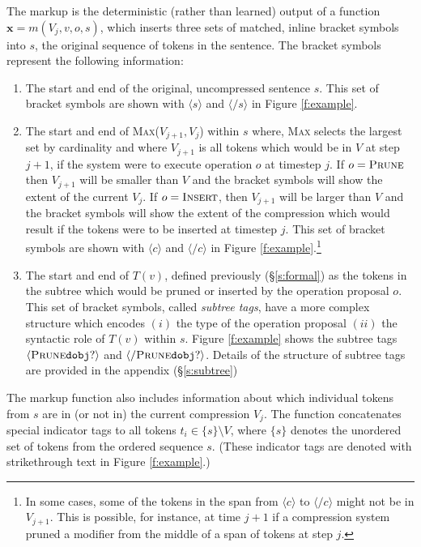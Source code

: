 \documentclass[11pt,a4paper]{article}
\begin{document}
The markup is the deterministic (rather than learned) output of a function $\bm{x}=m(V_j,v,o,s)$, which inserts three sets of matched, inline bracket symbols into $s$, the original sequence of tokens in the sentence. The bracket symbols represent the following information:

\begin{enumerate}
\item{The start and end of the original, uncompressed sentence $s$. This set of bracket symbols are shown with $\langle s \rangle$ and $\langle / s \rangle$ in Figure \ref{f:example}.}
\item{The start and end of \textsc{Max}($V_{j+1}, V_{j}$) within $s$ where, \textsc{Max} selects the largest set by cardinality and where $V_{j+1}$ is all tokens which would be in $V$ at step $j+1$, if the system were to execute operation $o$ at timestep $j$. If $o=\textsc{Prune}$ then $V_{j+1}$ will be smaller than $V$ and the bracket symbols will show the extent of the current $V_j$. If $o=\textsc{Insert}$, then $V_{j+1}$ will be larger than $V$ and the bracket symbols will show the extent of the compression which would result if the tokens were to be inserted at timestep $j$. This set of bracket symbols are shown with $\langle c \rangle$ and $\langle / c \rangle$ in Figure \ref{f:example}.\footnote{In some cases, some of the tokens in the span from $\langle c \rangle$ to $\langle /c \rangle$ might not be in $V_{j + 1}$. This is possible, for instance, at time $j+1$ if a compression system pruned a modifier from the middle of a span of tokens at step $j$.}}
\item{The start and end of $T(v)$, defined previously (\S\ref{s:formal}) as the tokens in the subtree which would be pruned or inserted by the operation proposal $o$. This set of bracket symbols, called \textit{subtree tags}, have a more complex structure which encodes $(i)$ the type of the operation proposal $(ii)$ the syntactic role of $T(v)$ within $s$. Figure \ref{f:example} shows the subtree tags $\langle \textsc{Prune} \texttt{dobj} ? \rangle$ and $\langle / \textsc{Prune} \texttt{dobj} ? \rangle$. Details of the structure of subtree tags are provided in the appendix (\S\ref{s:subtree})}
\end{enumerate}

The markup function also includes information about which individual tokens from $s$ are in (or not in) the current compression $V_j$. The function concatenates special indicator tags to all tokens $t_i \in \{s\} \setminus V$, where $\{s\}$ denotes the unordered set of tokens from the ordered sequence $s$. (These indicator tags are denoted with strikethrough text in Figure \ref{f:example}.) 
\end{document}
